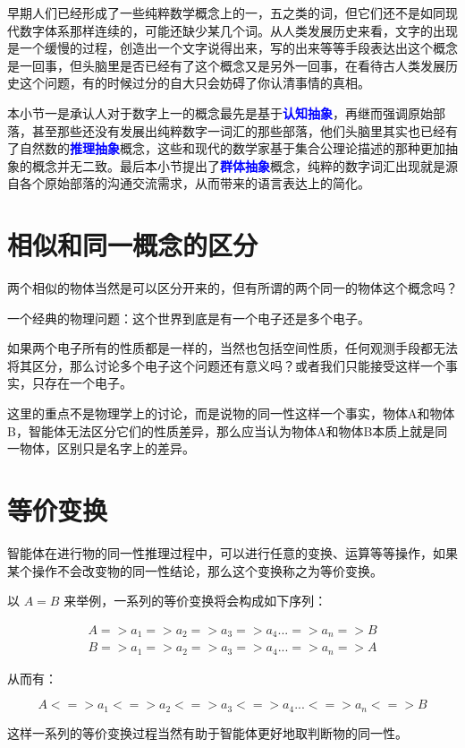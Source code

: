 \documentclass[12pt,oneside]{book}
\renewcommand{\emph}[1]{\textcolor{blue}{\textbf{#1}}}
\begin{document}
早期人们已经形成了一些纯粹数学概念上的一，五之类的词，但它们还不是如同现代数字体系那样连续的，可能还缺少某几个词。从人类发展历史来看，文字的出现是一个缓慢的过程，创造出一个文字说得出来，写的出来等等手段表达出这个概念是一回事，但头脑里是否已经有了这个概念又是另外一回事，在看待古人类发展历史这个问题，有的时候过分的自大只会妨碍了你认清事情的真相。

本小节一是承认人对于数字上一的概念最先是基于\emph{认知抽象}，再继而强调原始部落，甚至那些还没有发展出纯粹数字一词汇的那些部落，他们头脑里其实也已经有了自然数的\emph{推理抽象}概念，这些和现代的数学家基于集合公理论描述的那种更加抽象的概念并无二致。最后本小节提出了\emph{群体抽象}概念，纯粹的数字词汇出现就是源自各个原始部落的沟通交流需求，从而带来的语言表达上的简化。



\section{相似和同一概念的区分}
两个相似的物体当然是可以区分开来的，但有所谓的两个同一的物体这个概念吗？

一个经典的物理问题：这个世界到底是有一个电子还是多个电子。

如果两个电子所有的性质都是一样的，当然也包括空间性质，任何观测手段都无法将其区分，那么讨论多个电子这个问题还有意义吗？或者我们只能接受这样一个事实，只存在一个电子。

这里的重点不是物理学上的讨论，而是说物的同一性这样一个事实，物体A和物体B，智能体无法区分它们的性质差异，那么应当认为物体A和物体B本质上就是同一物体，区别只是名字上的差异。




\section{等价变换}
智能体在进行物的同一性推理过程中，可以进行任意的变换、运算等等操作，如果某个操作不会改变物的同一性结论，那么这个变换称之为等价变换。

以 $A=B$ 来举例，一系列的等价变换将会构成如下序列：

\begin{align*}
A => a_1 => a_2 => a_3 => a_4 ... => a_n => B \\
B => a_1 => a_2 => a_3 => a_4 ... => a_n => A
\end{align*}

从而有：

\[
A <=> a_1 <=> a_2 <=> a_3 <=> a_4 ... <=> a_n <=> B 
\]

这样一系列的等价变换过程当然有助于智能体更好地取判断物的同一性。
\end{document}
